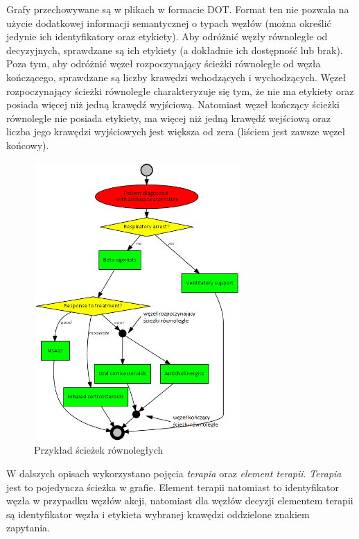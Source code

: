 Grafy przechowywane są w plikach w formacie DOT. Format ten nie pozwala na użycie dodatkowej informacji semantycznej o typach węzłów (można określić jedynie ich identyfikatory oraz etykiety). Aby odróżnić węzły równoległe od decyzyjnych, sprawdzane są ich etykiety (a dokładnie ich dostępność lub brak). Poza tym, aby odróżnić węzeł rozpoczynający ścieżki równoległe od węzła kończącego, sprawdzane są liczby krawędzi wchodzących i wychodzących. Węzeł rozpoczynający ścieżki równoległe charakteryzuje się tym, że nie ma etykiety oraz posiada więcej niż jedną krawędź wyjściową. Natomiast węzeł kończący ścieżki równoległe nie posiada etykiety, ma więcej niż jedną krawędź wejściową oraz liczba jego krawędzi wyjściowych jest większa od zera (liściem jest zawsze węzeł końcowy).

\begin{figure}[H]
\centering
\includegraphics[width=0.7\textwidth]{img/asthma_sciezki_rownolegle.png}
\caption{Przykład ścieżek równoległych}
\label{fig:sciezki_rownolegle}
\end{figure}

W dalszych opisach wykorzystano pojęcia \textit{terapia} oraz \textit{element terapii}. \textit{Terapia} jest to pojedyncza ścieżka w grafie. Element terapii natomiast to identyfikator węzła w przypadku węzłów akcji, natomiast dla węzłów decyzji elementem terapii są identyfikator węzła i etykieta wybranej krawędzi oddzielone znakiem zapytania. 

